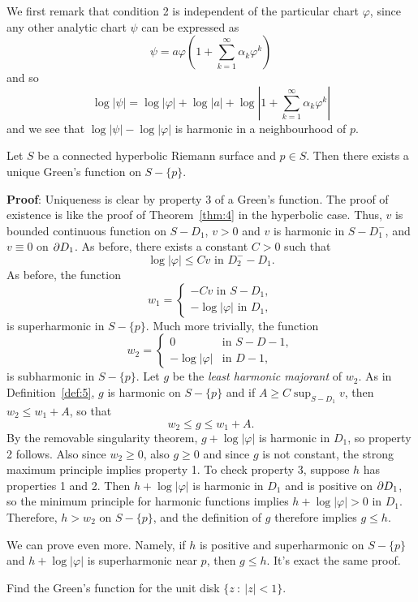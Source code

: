 \documentclass[a4paper,11pt]{article}
\begin{document}
We first remark that condition 2 is independent of the particular
chart $\varphi$, since any other analytic chart $\psi$ can be
expressed as
$$
\psi = a\varphi(1 + \sum_{k=1}^{\infty} \alpha_k \varphi^k)
$$
and so
$$
\log|\psi| = \log|\varphi|
+ \log|a| + \log\left| 1 + \sum_{k=1}^{\infty} \alpha_k \varphi^k \right|
$$
and we see that $\log|\psi| - \log|\varphi|$ is harmonic in a
neighbourhood of $p$.

\begin{propn}
  \label{propn:16}
  Let $S$ be a connected hyperbolic Riemann surface and $p \in S$.
  Then there exists a unique Green's function on $S - \{p\}$.
\end{propn}

\begin{mdframed}
  \textbf{Proof}:  Uniqueness is clear by property 3 of a Green's
  function.  The proof of existence is like the proof of
  Theorem~\ref{thm:4} in the hyperbolic case.  Thus, $v$ is bounded
  continuous function on $S - D_1$, $v > 0$ and $v$ is harmonic in
  $S-D_1^-$, and $v \equiv 0$ on $\partial D_1$.  As before, there exists a
  constant $C > 0$ such that
  $$
  \log|\varphi| \le C v \text{ in } D_2^- - D_1.
  $$
  As before, the function
  $$
  w_1 =
  \begin{cases}
    -Cv \text{ in } S-D_1,\\
    -\log|\varphi| \text{ in }D_1,
  \end{cases}
  $$
  is superharmonic in $S - \{p\}$.  Much more trivially, the function
  $$
  w_2 =
  \begin{cases}
    0 & \text{in } S-D-1,\\
    -\log|\varphi| & \text{in } D-1,
  \end{cases}
  $$
  is subharmonic in $S-\{p\}$.  Let $g$ be the \emph{least harmonic
    majorant} of $w_2$.  As in Definition~\ref{def:5}, $g$ is harmonic
  on $S - \{p\}$ and if $A \ge C \sup_{S-D_1} v$, then $w_2 \le w_1 +
  A$, so that
  $$
  w_2 \le g \le w_1 + A.
  $$
  By the removable singularity theorem, $g + \log|\varphi|$ is
  harmonic in $D_1$, so property 2 follows.  Also since $w_2 \ge 0$,
  also $g \ge 0$ and since $g$ is not constant, the strong maximum
  principle implies property 1.  To check property 3, suppose $h$ has
  properties 1 and 2.  Then $h + \log|\varphi|$ is harmonic in $D_1$
  and is positive on $\partial D_1$, so the minimum principle for harmonic
  functions implies $h + \log|\varphi| > 0$ in $D_1$.  Therefore, $h >
  w_2$ on $S - \{p\}$, and the definition of $g$ therefore implies $g
  \le h$.
\end{mdframed}

\begin{rem}
  We can prove even more.  Namely, if $h$ is positive and
  superharmonic on $S - \{p\}$ and  $h + \log|\varphi|$ is
  superharmonic near $p$, then $g \le h$.  It's exact the same proof.
\end{rem}

\begin{ques}
  \label{ques:9}
  Find the Green's function for the unit disk $\{z ~:~ |z| < 1\}$.
\end{ques}
\end{document}
